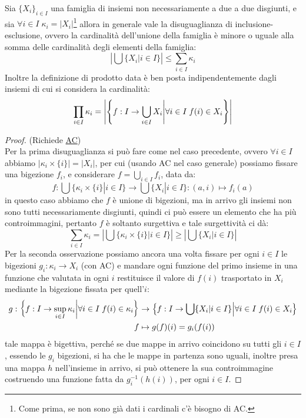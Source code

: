 \begin{note}
	Sia $\{X_i\}_{i \in I}$ una famiglia di insiemi non necessariamente a due a due disgiunti, e sia $\forall i \in I \; \kappa_i = |X_i|$\footnote{Come prima, se non sono già dati i cardinali c'è bisogno di AC.} allora in generale vale la disuguaglianza di inclusione-esclusione,
	ovvero la cardinalità dell'unione della famiglia è minore o uguale alla somma delle cardinalità degli elementi della famiglia:
	\[	\left\lvert\bigcup\{X_i | i \in I\} \right\rvert \leq \sum_{i \in I} \kappa_i
		\]
	Inoltre la definizione di prodotto data è ben posta indipendentemente dagli insiemi di cui si considera la cardinalità:
	\[ \prod_{i \in I} \kappa_i = \left\lvert\left\{f : I \to \bigcup_{i \in I} X_i \middle| \forall i \in I \; f(i) \in X_i\right\}\right\rvert 
		\]
\end{note}

\begin{proof}
	(Richiede \hyperref[ax9]{AC})\\
	Per la prima disuguaglianza si può fare come nel caso precedente, ovvero $\forall i \in I$ abbiamo $|\kappa_i \times \{i\}| = |X_i|$, per cui (usando AC nel caso generale) possiamo fissare una bigezione $f_i$, e considerare $f = \bigcup_{i \in I} f_i$, data da:
	\[ f : \bigcup\{\kappa_i \times \{i\} | i \in I\} \to \bigcup \{X_i | i \in I\} : (a,i) \mapsto f_i(a)
		\]
	in questo caso abbiamo che $f$ è unione di bigezioni, ma in arrivo gli insiemi non sono tutti necessariamente disgiunti, quindi ci può essere un elemento che ha più controimmagini, pertanto $f$ è soltanto surgettiva e tale surgettività ci dà:
	\[ \sum_{i \in I} \kappa_i = \left\lvert \bigcup\{\kappa_i \times \{i\} | i \in I\}\right\rvert \geq \left\lvert \bigcup \{X_i | i \in I\}\right\rvert 
		\]
	Per la seconda osservazione possiamo ancora una volta fissare per ogni $i \in I$ le bigezioni $g_i : \kappa_i \rightarrow X_i$ (con AC) e mandare ogni funzione del primo insieme in una funzione che valutata in ogni $i$ restituisce il valore di $f(i)$ trasportato in $X_i$ mediante la bigezione fissata per quell'$i$:
	\begin{align*}
		g : \left\{f : I \rightarrow \sup_{i \in I} \kappa_i \middle| \forall i \in I \; f(i) \in \kappa_i\right\} &\rightarrow \left\{f : I \rightarrow \bigcup \{X_i | i \in I\} \middle| \forall i \in I \; f(i) \in X_i\right\} \\
																								     f &\mapsto g(f)(i) = g_i(f(i))
	\end{align*}
	tale mappa è bigettiva, perché se due mappe in arrivo coincidono su tutti gli $i \in I$, essendo le $g_i$ bigezioni, si ha che le mappe in partenza sono uguali, inoltre presa una mappa $h$ nell'insieme in arrivo, si può ottenere la sua controimmagine costruendo una
	funzione fatta da $g_i^{-1}(h(i))$, per ogni $i \in I$.
\end{proof}

